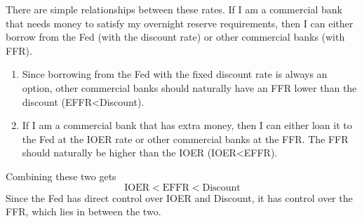 \documentclass{article}
\begin{document}
    \begin{theorem}[FFR]
      \label{thm:ffr}
      There are simple relationships between these rates. If I am a commercial bank that needs money to satisfy my overnight reserve requirements, then I can either borrow from the Fed (with the discount rate) or other commercial banks (with FFR). 
      \begin{enumerate}
        \item Since borrowing from the Fed with the fixed discount rate is always an option, other commercial banks should naturally have an FFR lower than the discount (EFFR<Discount).
        \item If I am a commercial bank that has extra money, then I can either loan it to the Fed at the IOER rate or other commercial banks at the FFR. The FFR should naturally be higher than the IOER (IOER<EFFR). 
      \end{enumerate}
      Combining these two gets 
      \begin{equation}
        \text{IOER} < \text{EFFR} < \text{Discount}
      \end{equation}
      Since the Fed has direct control over IOER and Discount, it has control over the FFR, which lies in between the two. 
    \end{theorem}
\end{document}
